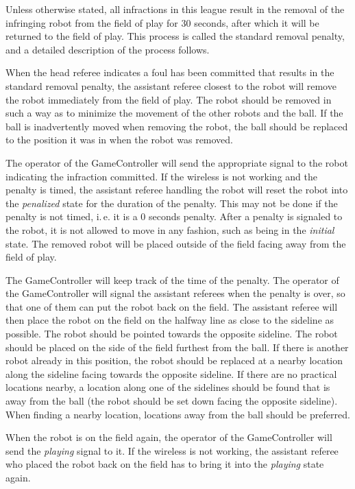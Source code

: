 \documentclass[12pt]{article}
\newcommand{\ie}{\mbox{i.\,e.}\xspace}
\begin{document}
Unless otherwise stated, all infractions in this league result in the removal of the infringing robot from the field of play for 30 seconds, after which it will be returned to the field of play. This process is called the standard removal penalty, and a detailed description of the process follows.

When the head referee indicates a foul has been committed that results in the standard removal penalty, the assistant referee closest to the robot will remove the robot immediately from the field of play. The robot should be removed in such a way as to minimize the movement of the other robots and the ball. If the ball is inadvertently moved when removing the robot, the ball should be replaced to the position it was in when the robot was removed.

The operator of the GameController will send the appropriate signal to the robot indicating the infraction committed. If the wireless is not working and the penalty is timed, the assistant referee handling the robot will reset the robot into the \emph{penalized} state for the duration of the penalty. This may not be done if the penalty is not timed, \ie it is a 0 seconds penalty. After a penalty is signaled to the robot, it is not allowed to move in any fashion, such as being in the \emph{initial} state. The removed robot will be placed outside of the field facing away from the field of play.

The GameController will keep track of the time of the penalty. The operator of the GameController will signal the assistant referees when the penalty is over, so that one of them can put the robot back on the field. The assistant referee will then place the robot on the field on the halfway line as close to the sideline as possible. The robot should be pointed towards the opposite sideline. The robot should be placed on the side of the field furthest from the ball. If there is another robot already in this position, the robot should be replaced at a nearby location along the sideline facing towards the opposite sideline. If there are no practical locations nearby, a location along one of the sidelines should be found that is away from the ball (the robot should be set down facing the opposite sideline). When finding a nearby location, locations away from the ball should be preferred.

When the robot is on the field again, the operator of the GameController will send the \emph{playing} signal to it. If the wireless is not working, the assistant referee who placed the robot back on the field has to bring it into the \emph{playing} state again.
\end{document}
